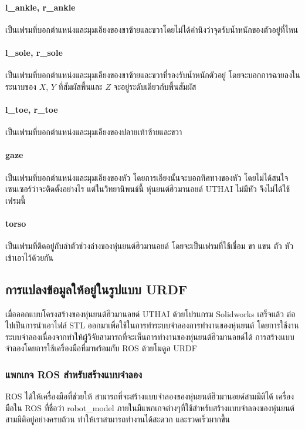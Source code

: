 \paragraph*{l\_ankle, r\_ankle}
เป็นเฟรมที่บอกตำแหน่งและมุมเอียงของขาซ้ายและขวาโดยไม่ได้คำนึงว่าจุดรับน้ำหนักของตัวอยู่ที่ไหน

\paragraph*{l\_sole, r\_sole}
เป็นเฟรมที่บอกตำแหน่งและมุมเอียงของขาซ้ายและขวาที่รองรับน้ำหนักตัวอยู่
โดยจะบอกการฉายลงในระนาบของ $X$, $Y$ ที่สัมผัสพื้นและ $Z$ จะอยู่ระดับเดียวกับพื้นสัมผัส

\paragraph*{l\_toe, r\_toe}
เป็นเฟรมที่บอกตำแหน่งและมุมเอียงของปลายเท้าซ้ายและขวา

\paragraph*{gaze}
เป็นเฟรมที่บอกตำแหน่งและมุมเอียงของหัว โดยการเอียงนั้นจะบอกทิศทางของหัว โดยไม่ได้สนใจเซนเซอร์ว่าจะติดตั้งอย่างไร
แต่ในวิทยานิพนธ์นี้ หุ่นยนต์ฮิวมานอยด์ UTHAI ไม่มีหัว จึงไม่ได้ใช้เฟรมนี้

\paragraph*{torso}
เป็นเฟรมที่ติดอยู่กับลำตัวช่วงล่างของหุ่นยนต์ฮิวมานอยด์ โดยจะเป็นเฟรมที่ใช้เชื่อม ขา แขน ตัว หัว เข้าเอาไว้ด้วยกัน





\clearpage
\subsection{การแปลงข้อมูลให้อยู่ในรูปแบบ URDF}
เมื่อออกแบบโครงสร้างของหุ่นยนต์ฮิวมานอยด์ UTHAI ด้วยโปรแกรม Solidworks เสร็จแล้ว
ต่อไปเป็นการนำเอาไฟล์ STL ออกมาเพื่อใช้ในการทำระบบจำลองการทำงานของหุ่นยนต์
โดยการใช้งานระบบจำลองเนื่องจากทำให้ผู้วิจัยสามารถที่จะเห็นการทำงานของหุ่นยนต์ฮิวมานอยด์ได้
การสร้างแบบจำลองโดยการใช้เครื่องมือที่มาพร้อมกับ ROS ด้วยโมดูล URDF

\subsubsection{แพกเกจ ROS สำหรับสร้างแบบจำลอง}
ROS ได้ให้เครื่องมือที่ช่วยให้ สามารถที่จะสร้างแบบจำลองของหุ่นยนต์ฮิวมานอยด์สามมิติได้
เครื่องมือใน ROS ที่ชื่อว่า robot\_model ภายในมีแพกเกจต่างๆที่ใช้สำหรับสร้างแบบจำลองของหุ่นยนต์สามมิติอยู่อย่างครบถ้วน
ทำให้เราสามารถทำงานได้สะดวก และรวดเร็วมากขึ้น

